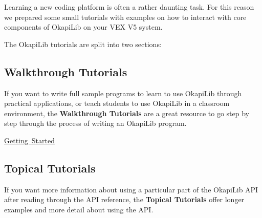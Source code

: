 Learning a new coding platform is often a rather daunting task. For this reason we prepared some small tutorials with examples on how to interact with core components of Okapi\+Lib on your V\+EX V5 system.

The Okapi\+Lib tutorials are split into two sections\+:

\subsection*{Walkthrough Tutorials}

If you want to write full sample programs to learn to use Okapi\+Lib through practical applications, or teach students to use Okapi\+Lib in a classroom environment, the {\bfseries{Walkthrough Tutorials}} are a great resource to go step by step through the process of writing an Okapi\+Lib program.


\begin{DoxyItemize}
\item \mbox{\hyperlink{md_docs_tutorials_walkthrough_gettingStarted}{Getting Started}}
\end{DoxyItemize}

\subsection*{Topical Tutorials}

If you want more information about using a particular part of the Okapi\+Lib A\+PI after reading through the A\+PI reference, the {\bfseries{Topical Tutorials}} offer longer examples and more detail about using the A\+PI. 